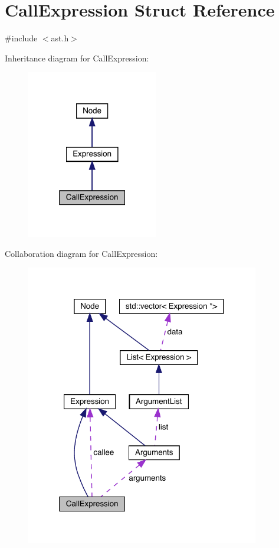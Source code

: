 \hypertarget{struct_call_expression}{}\section{Call\+Expression Struct Reference}
\label{struct_call_expression}


{\ttfamily \#include $<$ast.\+h$>$}



Inheritance diagram for Call\+Expression\+:\nopagebreak
\begin{figure}[H]
\begin{center}
\leavevmode
\includegraphics[width=163pt]{struct_call_expression__inherit__graph}
\end{center}
\end{figure}


Collaboration diagram for Call\+Expression\+:\nopagebreak
\begin{figure}[H]
\begin{center}
\leavevmode
\includegraphics[width=289pt]{struct_call_expression__coll__graph}
\end{center}
\end{figure}

